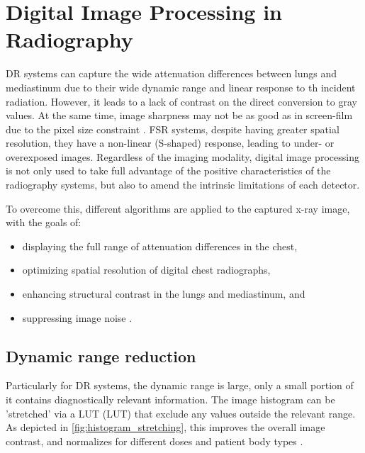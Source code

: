 \documentclass[nomenclature, english, bibtex]{kththesis}
\numberwithin{listing}{chapter}
\begin{document}
\section{Digital Image Processing in Radiography}
\label{sec:DigitalImageProcessing}


\acrshort{DR} systems can capture the wide attenuation differences between lungs and mediastinum due to
their wide dynamic range and linear response to th incident radiation. However, it leads to a lack of contrast on
the direct conversion to gray values. At the same time, image sharpness may not be as good as in screen-film
due to the pixel size constraint \cite[p.~148]{Prokop2003}. \acrshort{FSR} systems, despite having greater spatial
resolution, they have a non-linear (S-shaped) response, leading to under- or overexposed images\cite[p.~551]{vuylstekeMultiscaleImageContrast1994}.
Regardless of the imaging modality, digital image processing is not only used to take full advantage of the positive
characteristics of the radiography systems, but also to amend the intrinsic limitations of each detector.

To overcome this, different algorithms are applied to the captured x-ray image, with the goals of:

\begin{itemize}
    \item displaying the full range of attenuation differences in the chest,
    \item optimizing spatial resolution of digital chest radiographs,
    \item enhancing structural contrast in the lungs and mediastinum, and
    \item suppressing image noise \cite[p.~149]{Prokop2003}.
\end{itemize}


\subsection{Dynamic range reduction}

Particularly for \acrshort{DR} systems, the dynamic range is large, only a small portion of it contains diagnostically
relevant information. The image histogram can be 'stretched' via a \acrlong{LUT} (\acrshort{LUT}) that exclude
any values outside the relevant range. As depicted in \autoref{fig:histogram_stretching}, this improves the overall
image contrast, and normalizes for different doses and patient body types \cite[p.~151]{Prokop2003}.
\end{document}
